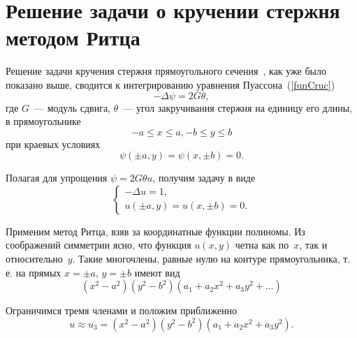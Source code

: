 \documentclass[12pt, a4paper]{article}
\begin{document}
\section{Решение задачи о кручении стержня методом Ритца}
Решение задачи кручения стержня прямоугольного сечения~\cite{Michilin}, как уже было показано выше,  сводится к интегрированию уравнения Пуассона~(\ref{funCruc})
 \[
-\Delta \psi = 2G \theta,
\]
где $G$~--- модуль сдвига, $\theta$~--- угол закручивания стержня на единицу
его длины, в прямоугольнике
\[
-a \leqslant x \leqslant a, -b \leqslant y \leqslant b
\]
при краевых условиях
\[
\psi(\pm a, y) =  \psi(x,\pm b) = 0.
\]

Полагая для упрощения $\psi = 2G \theta u$, получим задачу в виде
\begin{equation}
	\label{phi_ Poisson_2}
	\begin{cases}
	-\Delta u = 1, \\
	u(\pm a, y) =  u(x,\pm b) = 0.
	\end{cases}
\end{equation}

Применим метод Ритца, взяв за координатные функции полиномы.
Из соображений симметрии ясно, что функция $u(x, y)$ четна
как по~$x$, так и относительно~$y$. Такие многочлены, равные нулю на контуре прямоугольника, т.\,е. на прямых $x = \pm a$, $y = \pm b$ имеют вид
\begin{equation}\label{poly_Ritz}
	(x^2 - a^2)(y^2 - b^2)(a_1 + a_2x^2 + a_3 y^2 + \ldots)
\end{equation}

Ограничимся тремя членами и положим приближенно
\begin{equation}\label{u_3_poly_Ritz}
	u \approx u_3 = (x^2 - a^2)(y^2 - b^2)(a_1 + a_2 x^2 + a_3 y^2).
\end{equation}
\end{document}
